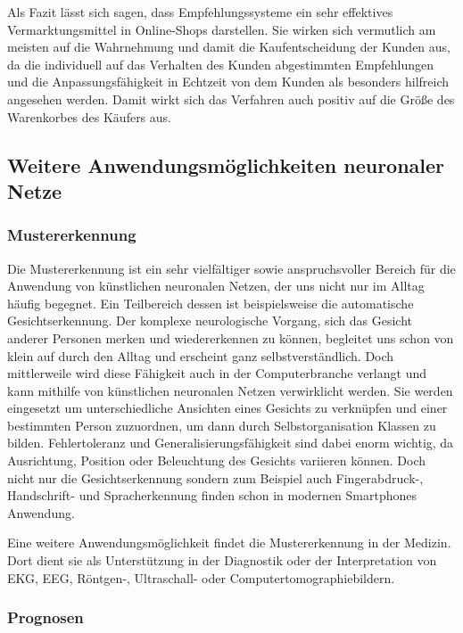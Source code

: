 \documentclass[twoside,a4paper,draft]{article}
\begin{document}
Als Fazit lässt sich sagen, dass Empfehlungssysteme ein sehr effektives Vermarktungsmittel in Online-Shops darstellen. Sie wirken sich vermutlich am meisten auf die Wahrnehmung und damit die Kaufentscheidung der Kunden aus, da die individuell auf das Verhalten des Kunden abgestimmten Empfehlungen und die Anpassungsfähigkeit in Echtzeit von dem Kunden als besonders hilfreich angesehen werden. Damit wirkt sich das Verfahren auch positiv auf die Größe des Warenkorbes des Käufers aus.

\subsection{Weitere Anwendungsmöglichkeiten neuronaler Netze}

\subsubsection{Mustererkennung}

Die Mustererkennung ist ein sehr vielfältiger sowie anspruchsvoller Bereich für die Anwendung von künstlichen neuronalen Netzen, der uns nicht nur im Alltag häufig begegnet. Ein Teilbereich dessen ist beispielsweise die automatische Gesichtserkennung. Der komplexe neurologische Vorgang, sich das Gesicht anderer Personen merken und wiedererkennen  zu können, begleitet uns schon von klein auf durch den Alltag und erscheint ganz selbstverständlich. Doch mittlerweile wird diese Fähigkeit auch in der Computerbranche verlangt und kann mithilfe von künstlichen neuronalen Netzen verwirklicht werden. Sie werden eingesetzt um unterschiedliche Ansichten eines Gesichts zu verknüpfen und einer bestimmten Person zuzuordnen, um dann durch Selbstorganisation Klassen zu bilden. Fehlertoleranz und Generalisierungsfähigkeit sind dabei enorm wichtig, da Ausrichtung, Position oder Beleuchtung des Gesichts variieren können. Doch nicht nur die Gesichtserkennung sondern zum Beispiel auch Fingerabdruck-, Handschrift- und Spracherkennung finden schon in modernen Smartphones Anwendung.

Eine weitere Anwendungsmöglichkeit findet die Mustererkennung in der Medizin. Dort dient sie als Unterstützung in der Diagnostik oder der Interpretation von EKG, EEG, Röntgen-, Ultraschall- oder Computertomographiebildern.

\subsubsection{Prognosen}
\end{document}
